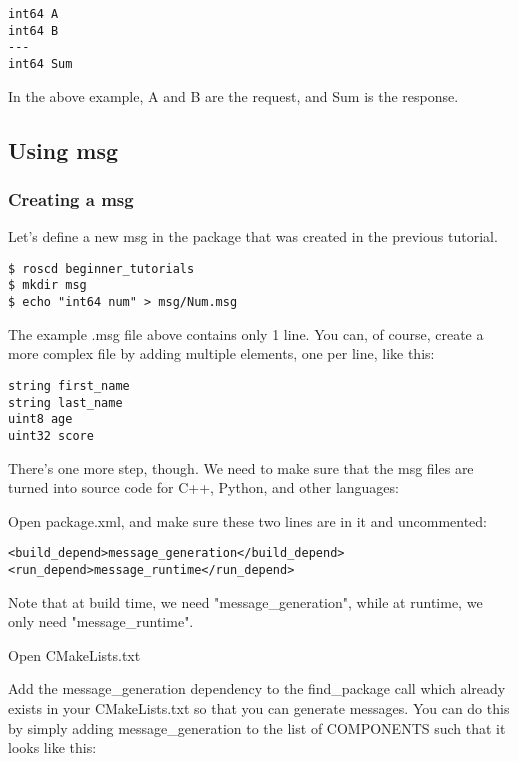 \begin{lstlisting}[breaklines=true languages=bash]
int64 A
int64 B
---
int64 Sum
\end{lstlisting}

In the above example, A and B are the request, and Sum is the response.

\subsection{Using msg}

\subsubsection{Creating a msg}
Let's define a new msg in the package that was created in the previous tutorial.
\begin{lstlisting}[breaklines=true languages=bash]
$ roscd beginner_tutorials
$ mkdir msg
$ echo "int64 num" > msg/Num.msg
\end{lstlisting}

The example .msg file above contains only 1 line. You can, of course, create a more complex file by adding multiple elements, one per line, like this:

\begin{lstlisting}[breaklines=true languages=bash]
string first_name
string last_name
uint8 age
uint32 score
\end{lstlisting}

There's one more step, though. We need to make sure that the msg files are turned into source code for C++, Python, and other languages:

Open package.xml, and make sure these two lines are in it and uncommented:

\begin{lstlisting}[breaklines=true languages=bash]
<build_depend>message_generation</build_depend>
<run_depend>message_runtime</run_depend>
\end{lstlisting}

Note that at build time, we need "message\_generation", while at runtime, we only need "message\_runtime".

Open CMakeLists.txt

Add the message\_generation dependency to the find\_package call which already exists in your CMakeLists.txt so that you can generate messages. You can do this by simply adding message\_generation to the list of COMPONENTS such that it looks like this:

